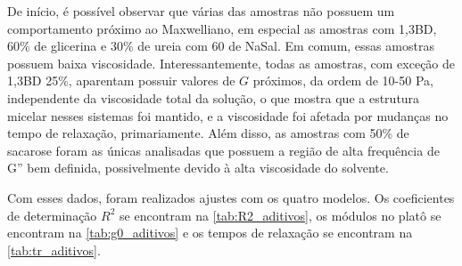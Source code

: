 	De início, é possível observar que várias das amostras não possuem um comportamento próximo ao Maxwelliano, em especial as amostras com 1,3BD, 60\% de glicerina e 30\% de ureia com 60 \mM{} de NaSal. Em comum, essas amostras possuem baixa viscosidade. Interessantemente, todas as amostras, com exceção de 1,3BD 25\%, aparentam possuir valores de \(G\) próximos, da ordem de 10-50 Pa, independente da viscosidade total da solução, o que mostra que a estrutura micelar nesses sistemas foi mantido, e a viscosidade foi afetada por mudanças no tempo de relaxação, primariamente. Além disso, as amostras com 50\% de sacarose foram as únicas analisadas que possuem a região de alta frequência de G'' bem definida, possivelmente devido à alta viscosidade do solvente.
	
	Com esses dados, foram realizados ajustes com os quatro modelos. Os coeficientes de determinação \(R^2\) se encontram na \autoref{tab:R2_aditivos}, os módulos no platô se encontram na \autoref{tab:g0_aditivos} e os tempos de relaxação se encontram na \autoref{tab:tr_aditivos}. 


